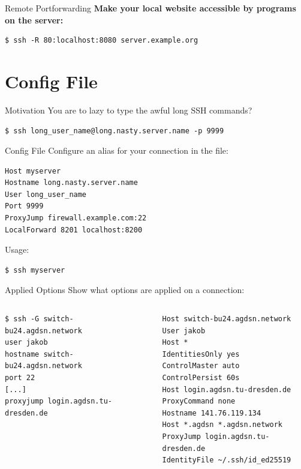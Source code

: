 \documentclass[10pt, graphics, aspectratio=169, table]{beamer}
\newcommand{\file}[1]{\dotuline{\texttt{#1}}}
\begin{document}
\begin{frame}[fragile]{Remote Portforwarding}
	\textbf{Make your local website accessible by programs on the server:}
	\begin{lstlisting}
$ ssh -R 80:localhost:8080 server.example.org
	\end{lstlisting}
\end{frame}

\section{Config File}
\begin{frame}[fragile]{Motivation}
	You are to lazy to type the awful long SSH commands?
	\begin{lstlisting}
$ ssh long_user_name@long.nasty.server.name -p 9999
	\end{lstlisting}
\end{frame}

\begin{frame}[fragile]{Config File}
	Configure an alias for your connection in the \file{$\sim$/.ssh/config} file:
	\begin{lstlisting}
Host myserver
Hostname long.nasty.server.name
User long_user_name
Port 9999
ProxyJump firewall.example.com:22
LocalForward 8201 localhost:8200
	\end{lstlisting}

	Usage:
	\begin{lstlisting}
$ ssh myserver
	\end{lstlisting}
\end{frame}

\begin{frame}[fragile]{Applied Options}
	Show what options are applied on a connection:
	\begin{columns}
		\begin{lstlisting}
$ ssh -G switch-bu24.agdsn.network
user jakob
hostname switch-bu24.agdsn.network
port 22
[...]
proxyjump login.agdsn.tu-dresden.de
		\end{lstlisting}
		\begin{lstlisting}
Host switch-bu24.agdsn.network
User jakob
Host *
IdentitiesOnly yes
ControlMaster auto
ControlPersist 60s
Host login.agdsn.tu-dresden.de
ProxyCommand none
Hostname 141.76.119.134
Host *.agdsn *.agdsn.network
ProxyJump login.agdsn.tu-dresden.de
IdentityFile ~/.ssh/id_ed25519
		\end{lstlisting}
    \end{columns}
\end{frame}
\end{document}
